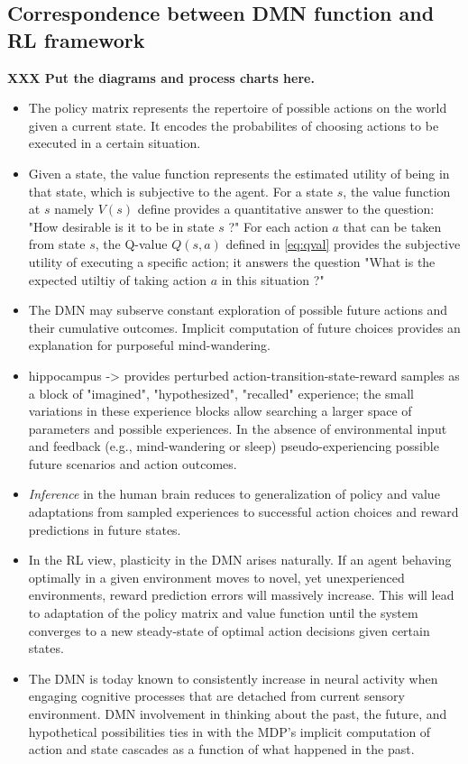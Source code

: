 \documentclass{article} %
\begin{document}
\subsection{Correspondence between DMN function and RL framework}
\textbf{XXX Put the diagrams and process charts here.}
\begin{itemize}
  \item The policy matrix represents the repertoire of possible actions
  on the world given a current state. It encodes the probabilites of
  choosing actions to be executed in a certain situation.
  \item Given a state, the value function represents the estimated utility of
  being in that state, which is subjective to the agent. 
  For a state $s$, the value function at $s$ namely $V(s)$ define provides a quantitative answer to the question:
  "How desirable is it to be in state $s$ ?"
  For each action $a$ that can be taken from state $s$,
  the Q-value  $Q(s, a)$ defined in \eqref{eq:qval} provides the subjective
  utility of executing a specific action; it answers the question
  "What is the expected utiltiy of taking action $a$ in this situation ?"
  \item The DMN may subserve
  constant exploration of possible future actions and their
  cumulative outcomes. Implicit computation of future choices 
  provides an explanation for purposeful mind-wandering.
  \item hippocampus -> provides perturbed action-transition-state-reward samples
  as a block of "imagined", "hypothesized", "recalled" experience;
  the small variations in these experience blocks allow searching
  a larger space of parameters and possible experiences.
  In the absence of environmental input and feedback
  (e.g., mind-wandering or sleep) pseudo-experiencing possible
  future scenarios and action outcomes.
  \item
  \textit{Inference} in the human brain reduces to generalization of
  policy and value adaptations from sampled experiences to
  successful action choices and reward predictions in future states.
  \item In the RL view, plasticity in the DMN arises naturally.
  If an agent behaving optimally in a given environment moves
  to novel, yet unexperienced environments, reward prediction errors will
  massively increase. This will lead to adaptation of the policy matrix
  and value function until the system converges to a
  new steady-state of optimal action decisions given certain states.
  \item The DMN is today known to consistently increase in neural
  activity when engaging cognitive processes that are detached from
  current sensory environment. DMN involvement in thinking about the past,
  the future, and hypothetical possibilities ties in with the
  MDP's implicit computation of action and state cascades as a function
  of what happened in the past.
  
\end{itemize}
\end{document}
